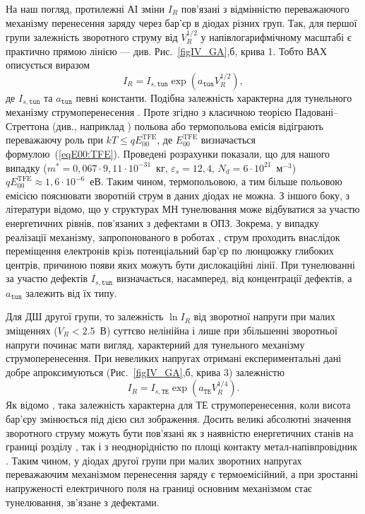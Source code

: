\documentclass[a4paper,14pt,oneside,openany]{memoir}
\begin{document}
На наш погляд, протилежні АІ зміни $I_R$ пов’язані з відмінністю переважаючого механізму перенесення заряду через бар'єр в діодах різних груп.
Так, для першої групи залежність зворотного струму від $V_R^{1/2}$ у напівлогарифмічному масштабі є практично прямою лінією --- див. Рис.~\ref{figIV_GA},б, крива 1.
Тобто ВАХ описується виразом
\begin{equation}\label{eqIR1:GA}
I_R=I_{s,\mathtt{tun}}\exp\left(a_\mathtt{tun}V_R^{1/2}\right),
\end{equation}
де
$I_{s,\mathtt{tun}}$ та $a_\mathtt{tun}$ певні константи.
Подібна залежність характерна для тунельного механізму струмоперенесення \cite{Rhoderick1988}.
Проте згідно з класичною теорією Падовані--Стреттона (див., наприклад \cite{Rhoderick1988,Singh1994}) польова або термопольова емісія відіграють
переважаючу роль при $kT\leq qE_{00}^\mathrm{TFE}$,
де $E_{00}^\mathrm{TFE}$ визначається формулою~(\ref{eqE00:TFE}).
Проведені розрахунки показали, що для нашого випадку ($m^*=0,067\cdot9,11\cdot10^{-31}$~кг,
$\varepsilon_s=12,4$, $N_d=6\cdot10^{21}$~м$^{-3}$) $qE_{00}^\mathrm{TFE}\approx1,6\cdot10^{-6}$~еВ.
Таким чином, термопольовою, а тим більше польовою емісією пояснювати зворотній струм в даних діодах не можна.
З іншого боку, з літератури \cite{Evstropov,Evstropov2000,Ganichev:2000,PipinsFTP,Pipinys1999} відомо, що у структурах МН тунелювання може відбуватися за участю енергетичних рівнів, пов'язаних з дефектами в ОПЗ.
Зокрема, у випадку реалізації механізму, запропонованого в роботах \cite{Evstropov,Evstropov2000}, струм проходить внаслідок переміщення електронів
крізь потенціальний бар'єр по люнцюжку глибоких центрів, причиною появи яких можуть бути дислокаційні лінії.
При тунелюванні за участю дефектів $I_{s,\mathtt{tun}}$ визначається, насамперед, від концентрації дефектів,
а $a_\mathtt{tun}$ залежить від їх типу.

Для ДШ другої групи, то залежність $\ln I_R$ від зворотної напруги при малих зміщеннях ($V_R<2.5$~В) суттєво нелінійна
і лише при збільшенні зворотньої напруги починає мати вигляд, характерний для тунельного механізму струмоперенесення.
При невеликих напругах отримані експериментальні дані добре апроксимуються (Рис.~\ref{figIV_GA},б, крива 3) залежністю
\begin{equation}\label{eqIR2:GA}
I_R=I_{s,\mathtt{TE}}\exp\left(a_\mathtt{TE}V_R^{1/4}\right).
\end{equation}
Як відомо \cite{Rhoderick1988},
така залежність характерна для ТЕ струмоперенесення, коли висота бар’єру змінюється під дією сил зображення.
Досить великі абсолютні значення зворотного струму можуть бути пов’язані як з наявністю енергетичних станів на границі розділу \cite{Singh1994,Tseng1987}, так і з неоднорідністю по площі контакту метал-напівпровідник \cite{Askerov:PhD}.
Таким чином, у діодах другої групи при малих зворотних напругах переважаючим механізмом перенесення заряду є термоемісійний, а при зростанні напруженості електричного поля на границі основним механізмом стає тунелювання, зв'язане з дефектами.
\end{document}
